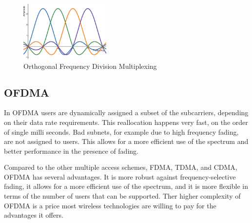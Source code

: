 \begin{figure}[H]
	\centering
	\includegraphics[width=0.4\textwidth]{Figures/ofdm.png}
	\caption{Orthogonal Frequency Division Multiplexing}
\end{figure}

\subsection{OFDMA}

In OFDMA users are dynamically assigned a subset of the subcarriers, depending on their data rate requirements. This reallocation happens very fast, on the order of single milli seconds. Bad subnets, for example due to high frequency fading, are not assigned to users. This allows for a more efficient use of the spectrum and better performance in the presence of fading.

Compared to the other multiple access schemes, FDMA, TDMA, and CDMA, OFDMA has several advantages. It is more robust against frequency-selective fading, it allows for a more efficient use of the spectrum, and it is more flexible in terms of the number of users that can be supported. Ther higher complexity of OFDMA is a price most wireless technologies are willing to pay for the advantages it offers.